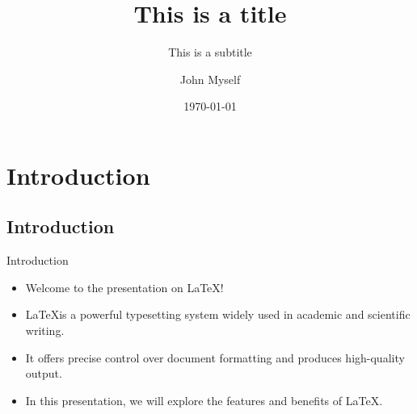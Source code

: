 \documentclass{SUSTechBeamer}
\title{This is a title}
\subtitle{This is a subtitle}
\author{John Myself}
\institute[SUSTech]{Southern University of Science and Technology}
\date{\today}
\begin{document}
\begin{frame}
    \titlepage
\end{frame}

\begin{frame}
    \tableofcontents
\end{frame}

\section{Introduction}
\subsection{Introduction}
\begin{frame}{Introduction}
  \begin{itemize}
    \item Welcome to the presentation on \LaTeX!
    \item \LaTeX is a powerful typesetting system widely used in academic and scientific writing.
    \item It offers precise control over document formatting and produces high-quality output.
    \item In this presentation, we will explore the features and benefits of \LaTeX.
  \end{itemize}
\end{frame}
\end{document}
